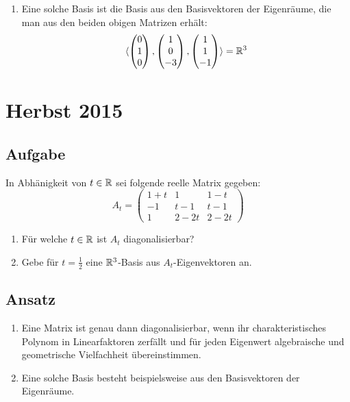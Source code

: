 \begin{enumerate}
	 \item Eine solche Basis ist die Basis aus den Basisvektoren der Eigenräume, die man aus den beiden obigen Matrizen erhält:
	 \begin{equation*}
	 	\langle \begin{pmatrix}
	 		0 \\ 1 \\ 0
	 	\end{pmatrix}, \begin{pmatrix}
	 		1 \\ 0 \\ -3
	 	\end{pmatrix}, \begin{pmatrix}
	 		1 \\ 1 \\ -1
	 	\end{pmatrix} \rangle = \mathbb{R}^3
	 \end{equation*}
\end{enumerate}

\newpage

\section{Herbst 2015}

\subsection{Aufgabe}
In Abhänigkeit von \( t \in \mathbb{R} \) sei folgende reelle Matrix gegeben:
\begin{equation*}
 A_t = \begin{pmatrix}
 	1+t & 1 & 1-t \\
 	-1 & t-1 & t-1 \\
 	1 & 2-2t & 2-2t
 \end{pmatrix}
\end{equation*}
\begin{enumerate}
	\item Für welche \( t \in \mathbb{R} \) ist \( A_t \) diagonalisierbar?
	\item Gebe für \( t = \tfrac{1}{2} \) eine \( \mathbb{R}^3 \)-Basis aus \( A_t \)-Eigenvektoren an. 
\end{enumerate}

\subsection{Ansatz}
\begin{enumerate}
	\item Eine Matrix ist genau dann diagonalisierbar, wenn ihr charakteristisches Polynom in Linearfaktoren zerfällt und für jeden Eigenwert algebraische und geometrische Vielfachheit übereinstimmen.
	\item Eine solche Basis besteht beispielsweise aus den Basisvektoren der Eigenräume. 
\end{enumerate}

